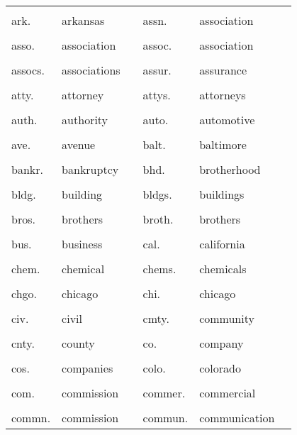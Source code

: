 \documentclass[10pt, letterpaper]{article}
\begin{document}
\begin{spacing}{1.0}
\begin{footnotesize}
\begin{longtable}[H]{p{1in}>{\raggedright}p{2in} p{0.2in} p{1in}>{\raggedright}p{2in} p{0in}}
    &  &  &  &  & \\[-6pt]
    ark. & arkansas & & assn. & association &\\
    &  &  &  &  & \\[-6pt]
    asso. & association & & assoc. & association &\\
    &  &  &  &  & \\[-6pt]
    assocs. & associations & & assur. & assurance &\\
    &  &  &  &  & \\[-6pt]
    atty. & attorney & & attys. & attorneys &\\
    &  &  &  &  & \\[-6pt]
    auth. & authority & & auto. & automotive &\\
    &  &  &  &  & \\[-6pt]
    ave. & avenue & & balt. & baltimore &\\
    &  &  &  &  & \\[-6pt]
    bankr. & bankruptcy & & bhd. & brotherhood &\\
    &  &  &  &  & \\[-6pt]
    bldg. & building & & bldgs. & buildings &\\
    &  &  &  &  & \\[-6pt]
    bros. & brothers & & broth. & brothers &\\
    &  &  &  &  & \\[-6pt]
    bus. & business & & cal. & california &\\
    &  &  &  &  & \\[-6pt]
    chem. & chemical & & chems. & chemicals &\\
    &  &  &  &  & \\[-6pt]
    chgo. & chicago & & chi. & chicago &\\
    &  &  &  &  & \\[-6pt]
    civ. & civil & & cmty. & community &\\
    &  &  &  &  & \\[-6pt]
    cnty. & county & & co. & company &\\
    &  &  &  &  & \\[-6pt]
    cos. & companies & & colo. & colorado &\\
    &  &  &  &  & \\[-6pt]
    com. & commission & & commer. & commercial &\\
    &  &  &  &  & \\[-6pt]
    commn. & commission & & commun. & communication &\\

\end{longtable}
\end{footnotesize}
\end{spacing}
\end{document}
